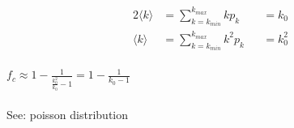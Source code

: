 \documentclass[../document.tex]{subfiles}
\begin{document}
\subsection{}

\begin{alignat*}{2}
\langle k \rangle &= \sum\limits^{k_{max}}_{k=k_{min}} k p_k   &&= k_0 \\
\langle k \rangle &= \sum\limits^{k_{max}}_{k=k_{min}} k^2 p_k &&= k_0^2
\end{alignat*} \\

$ f_c \approx 1 - \frac{ 1 }{ \frac{ k^2_0 }{ k_0 } - 1 } = 1 - \frac{ 1 }{ k_0 - 1 } $ \\ \\

See: poisson distribution
\end{document}
